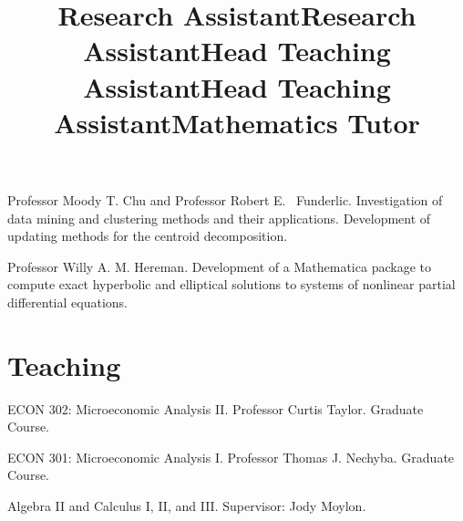 \documentclass[overlapped,line,draft,11pt,letterpaper]{res}
\begin{document}
\begin{resume}
\title{Research Assistant}
\begin{position}
  Professor Moody T. Chu and Professor Robert E. \
  Funderlic.  Investigation of data mining and clustering methods and
  their applications. Development of updating methods for the centroid
  decomposition.
\end{position}

\title{Research Assistant}
\begin{position}
  Professor Willy A. M. Hereman. Development of a Mathematica
  package to compute exact hyperbolic and elliptical solutions to
  systems of nonlinear partial differential equations.
\end{position}


\section{\bf Teaching}


\title{Head Teaching Assistant}
\begin{position}
  ECON 302: Microeconomic Analysis II. Professor Curtis Taylor.
  Graduate Course.
\end{position}

\title{Head Teaching Assistant}
\begin{position}
  ECON 301: Microeconomic Analysis I. Professor Thomas J. Nechyba.
  Graduate Course.
\end{position}

\title{Mathematics Tutor}
\begin{position}
  Algebra II and Calculus I, II, and III.  Supervisor: Jody Moylon.
\end{position}


\end{resume}
\end{document}
